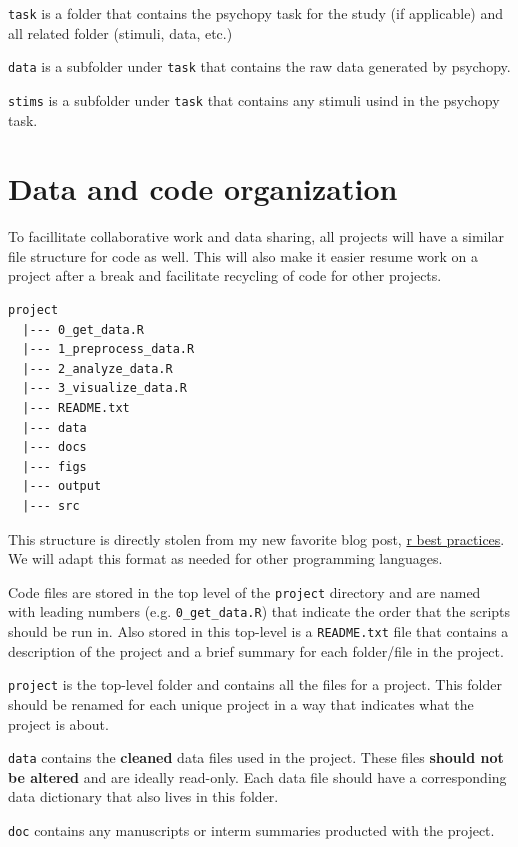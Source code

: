 \documentclass[]{book}
\begin{document}
\texttt{task} is a folder that contains the psychopy task for the study (if applicable) and all related folder (stimuli, data, etc.)

\texttt{data} is a subfolder under \texttt{task} that contains the raw data generated by psychopy.

\texttt{stims} is a subfolder under \texttt{task} that contains any stimuli usind in the psychopy task.

\hypertarget{data-and-code-organization}{%
\section{Data and code organization}\label{data-and-code-organization}}

To facillitate collaborative work and data sharing, all projects will have a similar file structure for code as well. This will also make it easier resume work on a project after a break and facilitate recycling of code for other projects.

\begin{verbatim}
project 
  |--- 0_get_data.R
  |--- 1_preprocess_data.R
  |--- 2_analyze_data.R
  |--- 3_visualize_data.R
  |--- README.txt
  |--- data
  |--- docs
  |--- figs
  |--- output
  |--- src
\end{verbatim}

This structure is directly stolen from my new favorite blog post, \href{https://kdestasio.github.io/post/r_best_practices/}{r best practices}. We will adapt this format as needed for other programming languages.

Code files are stored in the top level of the \texttt{project} directory and are named with leading numbers (e.g. \texttt{0\_get\_data.R}) that indicate the order that the scripts should be run in. Also stored in this top-level is a \texttt{README.txt} file that contains a description of the project and a brief summary for each folder/file in the project.

\texttt{project} is the top-level folder and contains all the files for a project. This folder should be renamed for each unique project in a way that indicates what the project is about.

\texttt{data} contains the \textbf{cleaned} data files used in the project. These files \textbf{should not be altered} and are ideally read-only. Each data file should have a corresponding data dictionary that also lives in this folder.

\texttt{doc} contains any manuscripts or interm summaries producted with the project.
\end{document}
